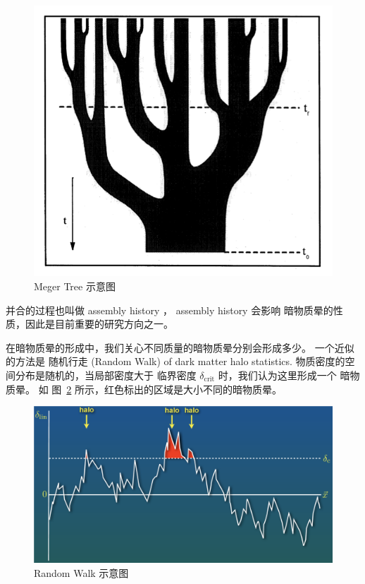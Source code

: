 \documentclass[12pt]{ctexart}
\newcommand{\reffig}[1]{图~\ref{#1}}
\begin{document}
\begin{figure}[!hbtp]
	\centering 
	\includegraphics[width=1.0\linewidth]{MegerTree.png}
	\caption{Meger Tree 示意图}
    \label{fig:MegerTree}
\end{figure}

并合的过程也叫做 assembly history ，
assembly history 会影响 暗物质晕的性质，因此是目前重要的研究方向之一。

在暗物质晕的形成中，我们关心不同质量的暗物质晕分别会形成多少。
一个近似的方法是
随机行走 (Random Walk) of dark matter halo statistics.
物质密度的空间分布是随机的，当局部密度大于 临界密度 $\delta_\text{crit}$ 时，我们认为这里形成一个 暗物质晕。 如 \reffig{fig:RandomWalk} 所示，红色标出的区域是大小不同的暗物质晕。

\begin{figure}[!hbtp]
	\centering 
	\includegraphics[width=1.0\linewidth]{Peaks_halo.png}
	\caption{Random Walk 示意图}
    \label{fig:RandomWalk}
\end{figure}
\end{document}
